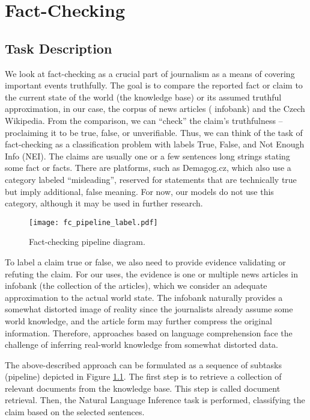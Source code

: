 \chapter{Fact-Checking}

\section{Task Description}

We look at fact-checking as a crucial part of journalism as a means of covering important events truthfully. 
The goal is to compare the reported fact or claim to the current state of the world (the knowledge base) or its assumed truthful approximation, in our case, the corpus of \CTK{} news articles (\CTK{} infobank) and the Czech Wikipedia.
From the comparison, we can ``check'' the claim's truthfulness -- proclaiming it to be true, false, or unverifiable. 
Thus, we can think of the task of fact-checking as a classification problem with labels True, False, and Not Enough Info (NEI). 
The claims are usually one or a few sentences long strings stating some fact or facts. 
There are platforms, such as Demagog.cz, which also use a category labeled ``misleading'', reserved for statements that are technically true but imply additional, false meaning.
For now, our models do not use this category, although it may be used in further research.

\begin{figure}[h!]
    \centering
    \texttt{[image: fc\_pipeline\_label.pdf]}
    \caption[Fact-Checking Pipeline]{Fact-checking pipeline diagram.}
    \label{fig:pipeline}
\end{figure}

To label a claim true or false, we also need to provide evidence validating or refuting the claim.
For our uses, the evidence is one or multiple news articles in \CTK{} infobank (the collection of the articles), which we consider an adequate approximation to the actual world state.
The infobank naturally provides a somewhat distorted image of reality since the journalists already assume some world knowledge, and the article form may further compress the original information.
Therefore, approaches based on language comprehension face the challenge of inferring real-world knowledge from somewhat distorted data. 

The above-described approach can be formulated as a sequence of subtasks (pipeline) depicted in Figure \ref{fig:pipeline}. The first step is to retrieve a collection of relevant documents from the knowledge base. This step is called document retrieval. Then, the Natural Language Inference task is performed, classifying the claim based on the selected sentences.

